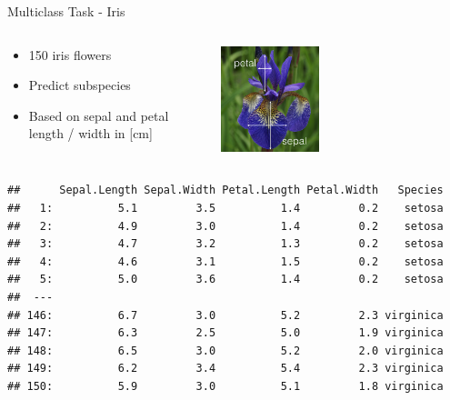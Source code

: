 \documentclass[11pt,compress,t,notes=noshow, xcolor=table]{beamer}
\begin{document}
\begin{vbframe}{Multiclass Task - Iris}

\begin{columns}[T]
\begin{column}{0.5\textwidth}
\begin{itemize}
\item 150 iris flowers 
\item Predict subspecies
\item Based on sepal and petal length / width in [cm]
\end{itemize}
\end{column}
\begin{column}{0.5\textwidth}
\includegraphics[width=0.4\textwidth]{figure_man/iris_petal_sepal.png} 
\end{column}
\end{columns}
\begin{knitrout}\scriptsize
{}\color{fgcolor}\begin{kframe}
\begin{verbatim}
##      Sepal.Length Sepal.Width Petal.Length Petal.Width   Species
##   1:          5.1         3.5          1.4         0.2    setosa
##   2:          4.9         3.0          1.4         0.2    setosa
##   3:          4.7         3.2          1.3         0.2    setosa
##   4:          4.6         3.1          1.5         0.2    setosa
##   5:          5.0         3.6          1.4         0.2    setosa
##  ---                                                            
## 146:          6.7         3.0          5.2         2.3 virginica
## 147:          6.3         2.5          5.0         1.9 virginica
## 148:          6.5         3.0          5.2         2.0 virginica
## 149:          6.2         3.4          5.4         2.3 virginica
## 150:          5.9         3.0          5.1         1.8 virginica
\end{verbatim}
\end{kframe}
\end{knitrout}
\end{vbframe}
\end{document}
